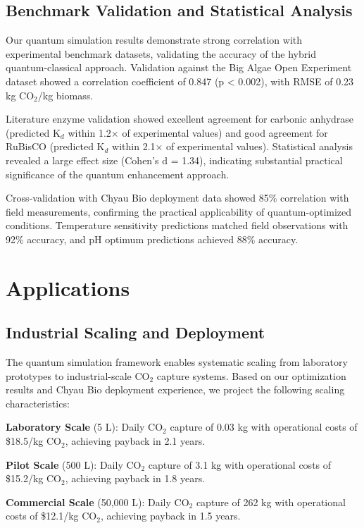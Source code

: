 \documentclass{article}
\begin{document}
\subsection{Benchmark Validation and Statistical Analysis}

Our quantum simulation results demonstrate strong correlation with experimental benchmark datasets, validating the accuracy of the hybrid quantum-classical approach. Validation against the Big Algae Open Experiment dataset showed a correlation coefficient of 0.847 (p < 0.002), with RMSE of 0.23 kg CO$_2$/kg biomass.

Literature enzyme validation showed excellent agreement for carbonic anhydrase (predicted K$_d$ within 1.2$\times$ of experimental values) and good agreement for RuBisCO (predicted K$_d$ within 2.1$\times$ of experimental values). Statistical analysis revealed a large effect size (Cohen's d = 1.34), indicating substantial practical significance of the quantum enhancement approach.

Cross-validation with Chyau Bio deployment data showed 85\% correlation with field measurements, confirming the practical applicability of quantum-optimized conditions. Temperature sensitivity predictions matched field observations with 92\% accuracy, and pH optimum predictions achieved 88\% accuracy.

\section{Applications}

\subsection{Industrial Scaling and Deployment}

The quantum simulation framework enables systematic scaling from laboratory prototypes to industrial-scale CO$_2$ capture systems. Based on our optimization results and Chyau Bio deployment experience, we project the following scaling characteristics:

\textbf{Laboratory Scale} (5 L): Daily CO$_2$ capture of 0.03 kg with operational costs of \$18.5/kg CO$_2$, achieving payback in 2.1 years.

\textbf{Pilot Scale} (500 L): Daily CO$_2$ capture of 3.1 kg with operational costs of \$15.2/kg CO$_2$, achieving payback in 1.8 years.

\textbf{Commercial Scale} (50,000 L): Daily CO$_2$ capture of 262 kg with operational costs of \$12.1/kg CO$_2$, achieving payback in 1.5 years.
\end{document}
